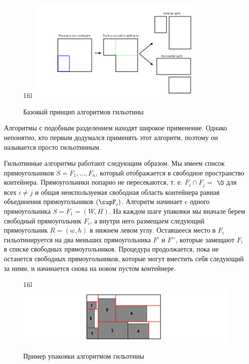 \documentclass[a4paper,12pt]{report}
\makeatletter
\newcommand*{\centerfloat}{%
  \parindent \z@
  \leftskip \z@ \@plus 1fil \@minus \textwidth
  \rightskip\leftskip
  \parfillskip \z@skip}
\makeatother
\begin{document}
\begin{figure}
    \centerfloat
    \includegraphics[width=0.8\textwidth]{packing/2.png}
    \caption{Базовый принцип алгоритмов гильотины \citep{Jylanki}}
    \label{fig:guil}
\end{figure}

Алгоритмы с подобным разделением находят широкое применение. Однако непонятно, кто первым додумался применять этот алгоритм, поэтому он называется просто гильотинным.

Гильотинные алгоритмы работают следующим образом. Мы имеем список прямоугольников $S = {F_1, … , F_n}$, который отображается в свободное пространство контейнера. Прямоугольники попарно не пересекаются, т. е. $F_i \cap F_j =$ $\O$ для всех $i \neq j$ и общая неиспользуемая свободная область контейнера равная объединения прямоугольников $(\cupF_i)$. Алгоритм начинает c одного прямоугольника $S = {F_1 = (W, H)}$. На каждом шаге упаковки мы вначале берем свободный прямоугольник $F_i$, а внутри него размещаем следующий прямоугольник $R = (w, h)$ в нижнем левом углу. Оставшееся место в $F_i$ гильотинируется на два меньших прямоугольника $F’$ и $F’’$, которые замещают $F_i$ в списке свободных прямоугольников. Процедура продолжается, пока не останется свободных прямоугольников, которые могут вместить  себя следующий за ними, и начинается снова на новом пустом контейнере.

\begin{figure}
    \centerfloat
    \includegraphics[width=1.5\textwidth]{packing/3.png}
    \caption{Пример упаковки алгоритмом гильотины \citep{Jylanki}}
    \label{fig:guil2}
\end{figure}
\end{document}
